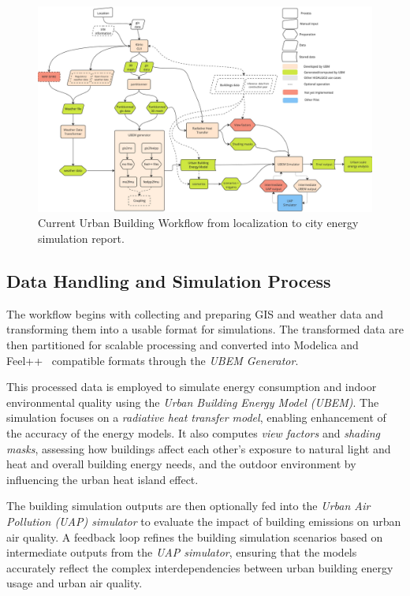 \documentclass[runningheads]{llncs}
\begin{document}
\begin{figure}
    \centering
    \includegraphics[width=.9\textwidth,page=1]{img-kub-workflow.pdf}
    \caption{Current Urban Building Workflow from localization to city energy simulation report.}
    \label{fig:kub-workflow}
\end{figure}


\subsection{Data Handling and Simulation Process}
\label{sec:data-handling}

The workflow begins with collecting and preparing GIS and weather data and transforming them into a usable format for simulations. The transformed data are then partitioned for scalable processing and converted into Modelica and Feel++~\cite{christophe_prudhomme_feelppfeelpp_2024} compatible formats through the \textit{UBEM Generator}.

This processed data is employed to simulate energy consumption and indoor environmental quality using the \textit{Urban Building Energy Model (UBEM)}. The simulation focuses on a \textit{radiative heat transfer model}, enabling enhancement of the accuracy of the energy models. It also computes \textit{view factors} and \textit{shading masks}, assessing how buildings affect each other's exposure to natural light and heat and overall building energy needs, and the outdoor environment by influencing the urban heat island effect.

The building simulation outputs are then optionally fed into the \textit{Urban Air Pollution (UAP) simulator} to evaluate the impact of building emissions on urban air quality. A feedback loop refines the building simulation scenarios based on intermediate outputs from the \textit{UAP simulator}, ensuring that the models accurately reflect the complex interdependencies between urban building energy usage and urban air quality.
\end{document}
